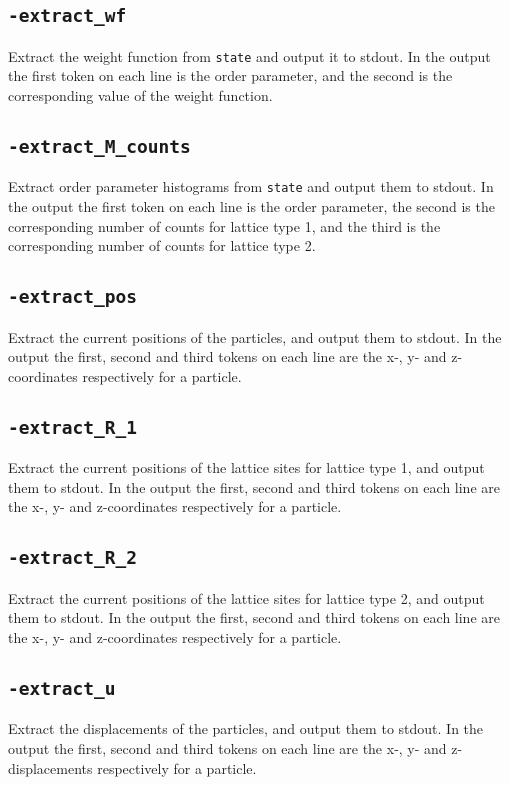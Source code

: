 \documentclass{report}
\begin{document}
\subsection{\texttt{-extract\_wf}}
Extract the weight function from \texttt{state} and output it to stdout. In the output the first token on each line is the order parameter, 
and the second is the corresponding value of the weight function.

\subsection{\texttt{-extract\_M\_counts}}
Extract order parameter histograms from \texttt{state} and output them to stdout. In the output the first token on each line is the order 
parameter, the second is the corresponding number of counts for lattice type 1, and the third is the corresponding number of counts for 
lattice type 2. 

\subsection{\texttt{-extract\_pos}}
Extract the current positions of the particles, and output them to stdout. In the output the first, second and third tokens on each line 
are the x-, y- and z-coordinates respectively for a particle. 

\subsection{\texttt{-extract\_R\_1}}
Extract the current positions of the lattice sites for lattice type 1, and output them to stdout. In the output the first, second and third 
tokens on each line are the x-, y- and z-coordinates respectively for a particle. 

\subsection{\texttt{-extract\_R\_2}}
Extract the current positions of the lattice sites for lattice type 2, and output them to stdout. In the output the first, second and third 
tokens on each line are the x-, y- and z-coordinates respectively for a particle.

\subsection{\texttt{-extract\_u}}
Extract the displacements of the particles, and output them to stdout. In the output the first, second and third tokens on each line are 
the x-, y- and z-displacements respectively for a particle. 
\end{document}
